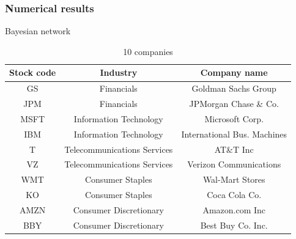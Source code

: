 \documentclass{beamer}
\begin{document}
\begin{frame}
\frametitle{Numerical results}
\begin{block}{Bayesian network}
\begin{table}[h!]\small
  \caption{10 companies}
\begin{center}
    \begin{tabular}{| c | c| c | }
    \hline
    Stock code& Industry & Company name\\
    \hline
GS&Financials&Goldman Sachs Group\\
JPM&Financials&JPMorgan Chase \& Co.\\
MSFT&Information Technology&Microsoft Corp.\\
IBM&Information Technology&International Bus. Machines\\
T&Telecommunications Services&AT\&T Inc\\
VZ&Telecommunications Services&Verizon Communications\\
WMT&Consumer Staples&Wal-Mart Stores\\
KO&Consumer Staples&Coca Cola Co.\\
AMZN&Consumer Discretionary&Amazon.com Inc\\
BBY&Consumer Discretionary&Best Buy Co. Inc.\\

\hline
\end{tabular}
\end{center}
\end{table}
\end{block}

\end{frame}
\end{document}
